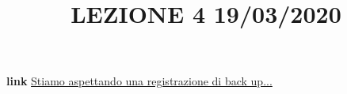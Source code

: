 \title{LEZIONE 4 19/03/2020}\newline
\textbf{link} \href{}{Stiamo aspettando una registrazione di back up...}
\section{}